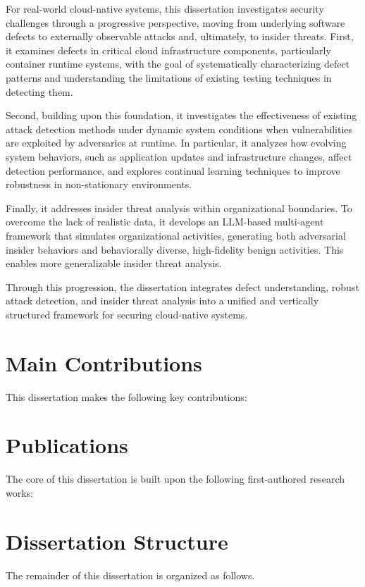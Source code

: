 For real-world cloud-native systems, this dissertation investigates security challenges through a progressive perspective, moving from underlying software defects to externally observable attacks and, ultimately, to insider threats. First, it examines defects in critical cloud infrastructure components, particularly container runtime systems, with the goal of systematically characterizing defect patterns and understanding the limitations of existing testing techniques in detecting them. 

Second, building upon this foundation, it investigates the effectiveness of existing attack detection methods under dynamic system conditions when vulnerabilities are exploited by adversaries at runtime. In particular, it analyzes how evolving system behaviors, such as application updates and infrastructure changes, affect detection performance, and explores continual learning techniques to improve robustness in non-stationary environments. 

Finally, it addresses insider threat analysis within organizational boundaries. To overcome the lack of realistic data, it develops an LLM-based multi-agent framework that simulates organizational activities, generating both adversarial insider behaviors and behaviorally diverse, high-fidelity benign activities. This enables more generalizable insider threat analysis.

Through this progression, the dissertation integrates defect understanding, robust attack detection, and insider threat analysis into a unified and vertically structured framework for securing cloud-native systems.

\section{Main Contributions}

This dissertation makes the following key contributions:

\section{Publications}
The core of this dissertation is built upon the following first-authored research works:

\section{Dissertation Structure}

The remainder of this dissertation is organized as follows.